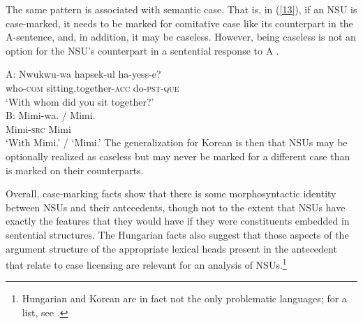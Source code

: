 {%
The same pattern is associated with semantic case. That is, in (\ref{13}), if an NSU is case-marked, it needs
to be marked for comitative case like its counterpart in the A-sentence, and, in addition, it may be caseless. However,  
being caseless is not an option for the NSU's counterpart in a sentential response to A \citep{Kim2015}.

\ea
A:
\gll Nwukwu-wa          hapsek-ul                     ha-yess-e?\\
     who-\textsc{com}   sitting.together-\textsc{acc} do-\textsc{pst}-\textsc{que}\\
\glt  `With whom did you sit together?'\\

B:
\gll Mimi-wa. / Mimi.\\
     Mimi-\textsc{src} {} {} Mimi\\
\glt `With Mimi.' / `Mimi.' \label{13}\z
%
The generalization for Korean is then that NSUs may be optionally realized as caseless but may never be marked for a different case than is marked on their counterparts.

Overall, case-marking facts show that there is some morphosyntactic identity between NSUs and their antecedents, though not to the extent that NSUs have exactly the features that they would have if they were constituents embedded in sentential structures. The Hungarian facts also suggest that those aspects of the argument structure of the appropriate lexical heads present in the antecedent that relate to case licensing are relevant for an analysis of NSUs.\footnote{Hungarian and Korean are in fact not the only problematic languages; for a list, see \citet{Vicente2015}.}

}

